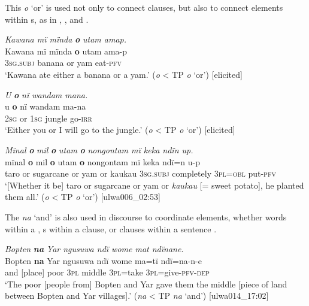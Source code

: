 This   \textit{o} ‘or’ is used not only to connect clauses, but also to connect elements within s, as in , , and .

\ea%
    \label{ex:complex:31}
          \textit{Kawana mï mïnda} \textbf{\textit{o}} \textit{utam amap.}\\
\gll    Kawana  mï      mïnda  \textbf{o}  utam  ama-p\\
    [name]    3\textsc{sg.subj}  banana  or  yam  eat-\textsc{pfv}\\
\glt `Kawana ate either a banana or a yam.’ (\textit{o} < TP \textit{o} ‘or’) [elicited]
\z

\ea%
    \label{ex:complex:32}
          \textit{U} \textbf{\textit{o}} \textit{nï wandam mana.}\\
\gll    u    \textbf{o}  nï    wandam  ma-na\\
    2\textsc{sg}  or  1\textsc{sg}  jungle    go-\textsc{irr}\\
\glt `Either you or I will go to the jungle.’ (\textit{o} < TP \textit{o} ‘or’) [elicited]
\z

\ea%
    \label{ex:complex:33}
          \textit{Mïnal} \textbf{\textit{o}} \textit{mil} \textbf{\textit{o}} \textit{utam} \textbf{\textit{o}} \textit{nongontam mï keka ndïn up.}\\
\gll    mïnal  \textbf{o}  mil      \textbf{o}  utam  \textbf{o}  nongontam   mï      keka      ndï=n    u-p\\
    taro  or  sugarcane  or  yam  or  kaukau    3\textsc{sg.subj}  completely  3\textsc{pl=obl}  put-\textsc{pfv}\\
\glt `[Whether it be] taro or sugarcane or yam or \textit{kaukau} [= sweet potato], he planted them all.’ (\textit{o} < TP \textit{o} ‘or’) [ulwa006\_02:53]
\z

The   \textit{na} ‘and’ is also used in discourse to coordinate elements, whether words within a  , s within a clause, or clauses within a sentence .

\ea%
    \label{ex:complex:34}
          \textit{Bopten} \textbf{\textit{na}} \textit{Yar ngusuwa ndï wome mat ndïnane.}\\
\gll    Bopten  \textbf{na}  Yar    ngusuwa  ndï   wome    ma=tï ndï=na-n-e\\
    [place]  and  [place]  poor    3\textsc{pl}   middle  \textsc{3pl}=take    \textsc{3pl}=give-\textsc{pfv-dep}\\
\glt `The poor [people from] Bopten and Yar gave them the middle [piece of land between Bopten and Yar villages].’ (\textit{na} < TP \textit{na} ‘and’) [ulwa014\_17:02]
\z

